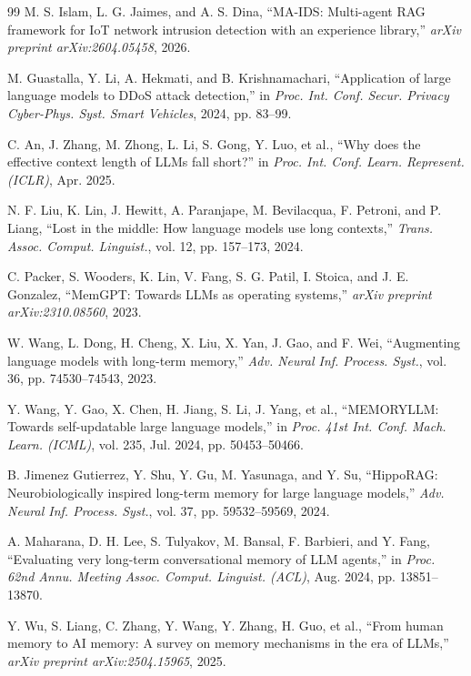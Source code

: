 \documentclass[11pt,letterpaper,onecolumn]{article}
\begin{document}
\begin{thebibliography}{99}
M. S. Islam, L. G. Jaimes, and A. S. Dina, ``MA-IDS: Multi-agent RAG framework for IoT network intrusion detection with an experience library,'' \emph{arXiv preprint arXiv:2604.05458}, 2026.

M. Guastalla, Y. Li, A. Hekmati, and B. Krishnamachari, ``Application of large language models to DDoS attack detection,'' in \emph{Proc. Int. Conf. Secur. Privacy Cyber-Phys. Syst. Smart Vehicles}, 2024, pp. 83--99.

C. An, J. Zhang, M. Zhong, L. Li, S. Gong, Y. Luo, et al., ``Why does the effective context length of LLMs fall short?'' in \emph{Proc. Int. Conf. Learn. Represent. (ICLR)}, Apr. 2025.

N. F. Liu, K. Lin, J. Hewitt, A. Paranjape, M. Bevilacqua, F. Petroni, and P. Liang, ``Lost in the middle: How language models use long contexts,'' \emph{Trans. Assoc. Comput. Linguist.}, vol. 12, pp. 157--173, 2024.

C. Packer, S. Wooders, K. Lin, V. Fang, S. G. Patil, I. Stoica, and J. E. Gonzalez, ``MemGPT: Towards LLMs as operating systems,'' \emph{arXiv preprint arXiv:2310.08560}, 2023.

W. Wang, L. Dong, H. Cheng, X. Liu, X. Yan, J. Gao, and F. Wei, ``Augmenting language models with long-term memory,'' \emph{Adv. Neural Inf. Process. Syst.}, vol. 36, pp. 74530--74543, 2023.

Y. Wang, Y. Gao, X. Chen, H. Jiang, S. Li, J. Yang, et al., ``MEMORYLLM: Towards self-updatable large language models,'' in \emph{Proc. 41st Int. Conf. Mach. Learn. (ICML)}, vol. 235, Jul. 2024, pp. 50453--50466.

B. Jimenez Gutierrez, Y. Shu, Y. Gu, M. Yasunaga, and Y. Su, ``HippoRAG: Neurobiologically inspired long-term memory for large language models,'' \emph{Adv. Neural Inf. Process. Syst.}, vol. 37, pp. 59532--59569, 2024.

A. Maharana, D. H. Lee, S. Tulyakov, M. Bansal, F. Barbieri, and Y. Fang, ``Evaluating very long-term conversational memory of LLM agents,'' in \emph{Proc. 62nd Annu. Meeting Assoc. Comput. Linguist. (ACL)}, Aug. 2024, pp. 13851--13870.

Y. Wu, S. Liang, C. Zhang, Y. Wang, Y. Zhang, H. Guo, et al., ``From human memory to AI memory: A survey on memory mechanisms in the era of LLMs,'' \emph{arXiv preprint arXiv:2504.15965}, 2025.


\end{thebibliography}
\end{document}
